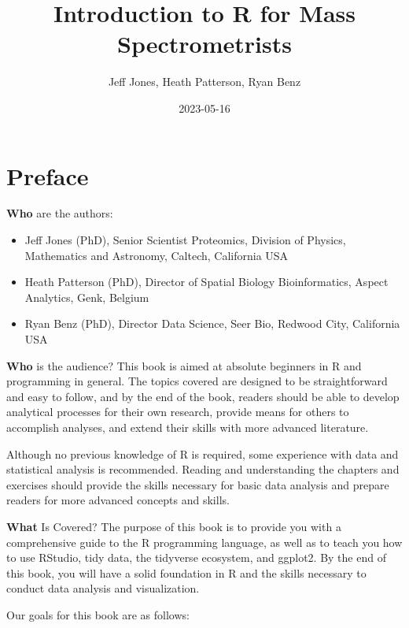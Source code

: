 \documentclass[
]{book}
\title{Introduction to R for Mass Spectrometrists}
\author{Jeff Jones, Heath Patterson, Ryan Benz}
\date{2023-05-16}
\begin{document}
\maketitle

{
\setcounter{tocdepth}{1}
\tableofcontents
}
\hypertarget{preface}{%
\chapter*{Preface}\label{preface}}

\textbf{Who} are the authors:

\begin{itemize}
\item
  Jeff Jones (PhD), Senior Scientist Proteomics, Division of Physics, Mathematics and Astronomy, Caltech, California USA
\item
  Heath Patterson (PhD), Director of Spatial Biology Bioinformatics, Aspect Analytics, Genk, Belgium
\item
  Ryan Benz (PhD), Director Data Science, Seer Bio, Redwood City, California USA
\end{itemize}

\textbf{Who} is the audience? This book is aimed at absolute beginners in R and programming in general. The topics covered are designed to be straightforward and easy to follow, and by the end of the book, readers should be able to develop analytical processes for their own research, provide means for others to accomplish analyses, and extend their skills with more advanced literature.

Although no previous knowledge of R is required, some experience with data and statistical analysis is recommended. Reading and understanding the chapters and exercises should provide the skills necessary for basic data analysis and prepare readers for more advanced concepts and skills.

\textbf{What} Is Covered? The purpose of this book is to provide you with a comprehensive guide to the R programming language, as well as to teach you how to use RStudio, tidy data, the tidyverse ecosystem, and ggplot2. By the end of this book, you will have a solid foundation in R and the skills necessary to conduct data analysis and visualization.

Our goals for this book are as follows:
\end{document}
